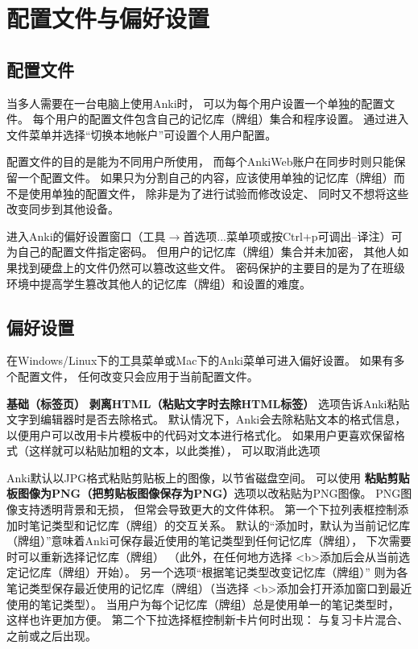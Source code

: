 \documentclass[a4paper]{book}
\begin{document}
	\chapter{配置文件与偏好设置}
	
	\section{配置文件}\label{profiles}
	
	当多人需要在一台电脑上使用Anki时， 可以为每个用户设置一个单独的配置文件。 每个用户的配置文件包含自己的记忆库（牌组）集合和程序设置。 通过进入文件菜单并选择“切换本地帐户”可设置个人用户配置。
	
	\begin{shaded}
		配置文件的目的是能为不同用户所使用， 而每个AnkiWeb账户在同步时则只能保留一个配置文件。 如果只为分割自己的内容，应该使用单独的记忆库（牌组）而不是使用单独的配置文件， 除非是为了进行试验而修改设定、 同时又不想将这些改变同步到其他设备。
	\end{shaded}
	
	进入Anki的偏好设置窗口（工具$\to$首选项...菜单项或按Ctrl+p可调出--译注）可为自己的配置文件指定密码。 但用户的记忆库（牌组）集合并未加密， 其他人如果找到硬盘上的文件仍然可以篡改这些文件。 密码保护的主要目的是为了在班级环境中提高学生篡改其他人的记忆库（牌组）和设置的难度。
	
	\section{偏好设置}\label{preferences}
	在Windows/Linux下的工具菜单或Mac下的Anki菜单可进入偏好设置。 如果有多个配置文件， 任何改变只会应用于当前配置文件。
	
	\textbf{基础（标签页）}
	\textbf{剥离HTML（粘贴文字时去除HTML标签）} 选项告诉Anki粘贴文字到编辑器时是否去除格式。 默认情况下，Anki会去除粘贴文本的格式信息， 以便用户可以改用卡片模板中的代码对文本进行格式化。 如果用户更喜欢保留格式（这样就可以粘贴加粗的文本，以此类推）， 可以取消此选项
	
	Anki默认以JPG格式粘贴剪贴板上的图像，以节省磁盘空间。 可以使用
	\textbf{粘贴剪贴板图像为PNG（把剪贴板图像保存为PNG）}选项以改粘贴为PNG图像。 PNG图像支持透明背景和无损， 但常会导致更大的文件体积。
	第一个下拉列表框控制添加时笔记类型和记忆库（牌组）的交互关系。 默认的“添加时，默认为当前记忆库（牌组）”意味着Anki可保存最近使用的笔记类型到任何记忆库（牌组）， 下次需要时可以重新选择记忆库（牌组） （此外，在任何地方选择
	<b>添加后会从当前选定记忆库（牌组）开始）。 另一个选项“根据笔记类型改变记忆库（牌组）” 则为各笔记类型保存最近使用的记忆库（牌组）（当选择
	<b>添加会打开添加窗口到最近使用的笔记类型）。 当用户为每个记忆库（牌组）总是使用单一的笔记类型时， 这样也许更加方便。
	第二个下拉选择框控制新卡片何时出现： 与复习卡片混合、之前或之后出现。
	
\end{document}
